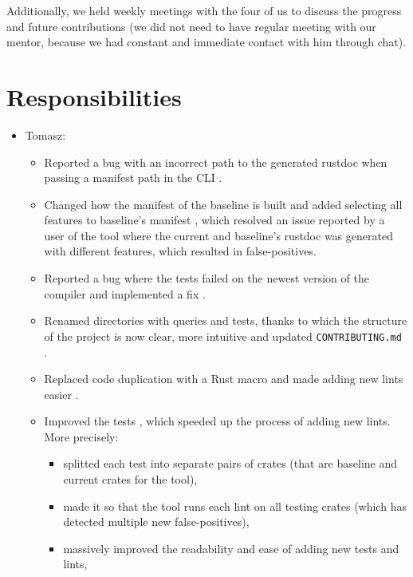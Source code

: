 \documentclass[licencjacka,en]{pracamgr}
\begin{document}
Additionally, we held weekly meetings with the four of us to discuss the progress and future
contributions (we did not need to have regular meeting with our mentor, because we had constant
and immediate contact with him through chat).

\section{Responsibilities}

\begin{itemize}
	\item Tomasz:
		\begin{itemize}
			\item Reported a bug with an incorrect path to the generated rustdoc when passing
				a manifest path in the CLI \cite{issue_wrong_path_manifest_path}.
			\item Changed how the manifest of the baseline is built and added
				selecting all features to baseline's manifest \cite{pr_changed_how_manifest_baseline_built},
				which resolved an issue reported by a user of the tool
				\cite{issue_baseline_rustdoc_from_registry_default_features}
				where the current and baseline's rustdoc was generated with different features,
				which resulted in false-positives.
			\item Reported a bug where the tests failed on the newest version
				of the compiler \cite{issue_tests_fail_on_nightly}
				and implemented a fix \cite{pr_tests_fail_on_nightly}.
			\item Renamed directories with queries and tests, thanks to which the
				structure of the project is now clear, more intuitive
				\cite{pr_renamed_directories} \cite{pr_renamed_directories_2}
				and updated \texttt{CONTRIBUTING.md} \cite{pr_renamed_directories_3}.
			\item Replaced code duplication with a Rust macro and made adding new
				lints easier \cite{pr_one_macro}.
			\item Improved the tests \cite{pr_split_each_test},
				which speeded up the process of adding new lints.
				More precisely:
				\begin{itemize}
					\item splitted each test into separate pairs of crates
						(that are baseline and current crates for the tool),
					\item made it so that the tool runs each lint on all testing crates
						(which has detected multiple new false-positives),
					\item massively improved the readability and ease of adding new tests and lints,

\end{itemize}
\end{itemize}
\end{itemize}
\end{document}
